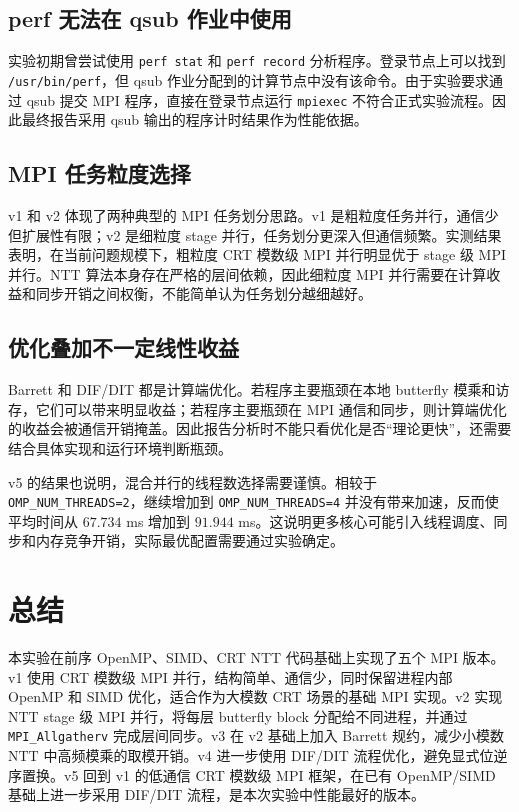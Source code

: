 \documentclass[a4paper]{article}
\begin{document}
\subsection{perf 无法在 qsub 作业中使用}

实验初期曾尝试使用 \texttt{perf stat} 和 \texttt{perf record} 分析程序。登录节点上可以找到 \texttt{/usr/bin/perf}，但 qsub 作业分配到的计算节点中没有该命令。由于实验要求通过 qsub 提交 MPI 程序，直接在登录节点运行 \texttt{mpiexec} 不符合正式实验流程。因此最终报告采用 qsub 输出的程序计时结果作为性能依据。

\subsection{MPI 任务粒度选择}

v1 和 v2 体现了两种典型的 MPI 任务划分思路。v1 是粗粒度任务并行，通信少但扩展性有限；v2 是细粒度 stage 并行，任务划分更深入但通信频繁。实测结果表明，在当前问题规模下，粗粒度 CRT 模数级 MPI 并行明显优于 stage 级 MPI 并行。NTT 算法本身存在严格的层间依赖，因此细粒度 MPI 并行需要在计算收益和同步开销之间权衡，不能简单认为任务划分越细越好。

\subsection{优化叠加不一定线性收益}

Barrett 和 DIF/DIT 都是计算端优化。若程序主要瓶颈在本地 butterfly 模乘和访存，它们可以带来明显收益；若程序主要瓶颈在 MPI 通信和同步，则计算端优化的收益会被通信开销掩盖。因此报告分析时不能只看优化是否“理论更快”，还需要结合具体实现和运行环境判断瓶颈。

v5 的结果也说明，混合并行的线程数选择需要谨慎。相较于 \texttt{OMP\_NUM\_THREADS=2}，继续增加到 \texttt{OMP\_NUM\_THREADS=4} 并没有带来加速，反而使平均时间从 $67.734$ ms 增加到 $91.944$ ms。这说明更多核心可能引入线程调度、同步和内存竞争开销，实际最优配置需要通过实验确定。

\section{总结}

本实验在前序 OpenMP、SIMD、CRT NTT 代码基础上实现了五个 MPI 版本。v1 使用 CRT 模数级 MPI 并行，结构简单、通信少，同时保留进程内部 OpenMP 和 SIMD 优化，适合作为大模数 CRT 场景的基础 MPI 实现。v2 实现 NTT stage 级 MPI 并行，将每层 butterfly block 分配给不同进程，并通过 \texttt{MPI\_Allgatherv} 完成层间同步。v3 在 v2 基础上加入 Barrett 规约，减少小模数 NTT 中高频模乘的取模开销。v4 进一步使用 DIF/DIT 流程优化，避免显式位逆序置换。v5 回到 v1 的低通信 CRT 模数级 MPI 框架，在已有 OpenMP/SIMD 基础上进一步采用 DIF/DIT 流程，是本次实验中性能最好的版本。
\end{document}
